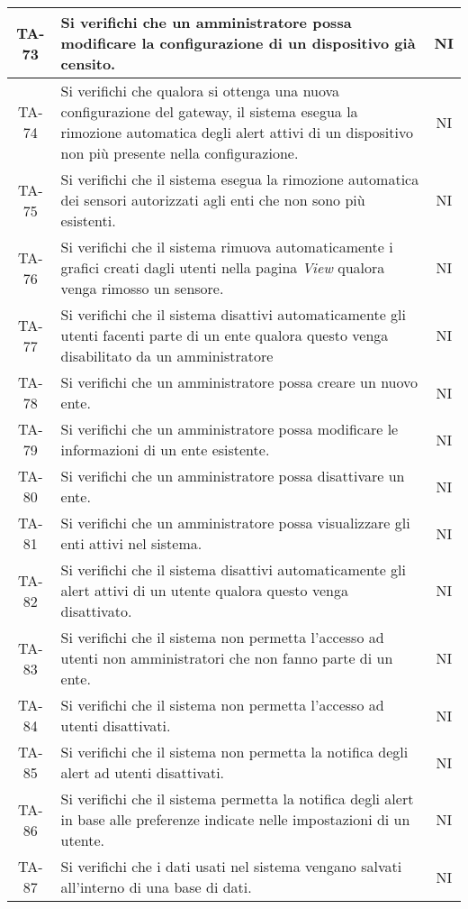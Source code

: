 \begin{center}
\begin{longtable}{|c|p{10cm}|c|}
			 \hline
			 TA-73 & Si verifichi che un amministratore possa modificare la configurazione di un dispositivo già censito. & NI \\
			 \hline
			 TA-74 & Si verifichi che qualora si ottenga una nuova configurazione del gateway, il sistema esegua la rimozione automatica degli alert attivi di un dispositivo non più presente nella configurazione. & NI \\
			 \hline
			 TA-75 & Si verifichi che il sistema esegua la rimozione automatica dei sensori autorizzati agli enti che non sono più esistenti. & NI \\
			 \hline
			 TA-76 & Si verifichi che il sistema rimuova automaticamente i grafici creati dagli utenti nella pagina \textit{View} qualora venga rimosso un sensore. & NI \\
			 \hline
			 TA-77 & Si verifichi che il sistema disattivi automaticamente gli utenti facenti parte di un ente qualora questo venga disabilitato da un amministratore & NI \\
			 \hline
			 TA-78 & Si verifichi che un amministratore possa creare un nuovo ente. & NI \\
			 \hline
			 TA-79 & Si verifichi che un amministratore possa modificare le informazioni di un ente esistente. & NI \\
			 \hline
			 TA-80 & Si verifichi che un amministratore possa disattivare un ente. & NI \\
			 \hline
			 TA-81 & Si verifichi che un amministratore possa visualizzare gli enti attivi nel sistema. & NI \\
			 \hline
			 TA-82 & Si verifichi che il sistema disattivi automaticamente gli alert attivi di un utente qualora questo venga disattivato. & NI \\
			 \hline
			 TA-83 & Si verifichi che il sistema non permetta l'accesso ad utenti non amministratori che non fanno parte di un ente. & NI \\
			 \hline
			 TA-84 & Si verifichi che il sistema non permetta l'accesso ad utenti disattivati. & NI \\
			 \hline
			 TA-85 & Si verifichi che il sistema non permetta la notifica degli alert ad utenti disattivati. & NI \\
			 \hline
			 TA-86 & Si verifichi che il sistema permetta la notifica degli alert in base alle preferenze indicate nelle impostazioni di un utente. & NI \\
			 \hline
			 TA-87 & Si verifichi che i dati usati nel sistema vengano salvati all'interno di una base di dati. & NI \\

\end{longtable}
\end{center}
